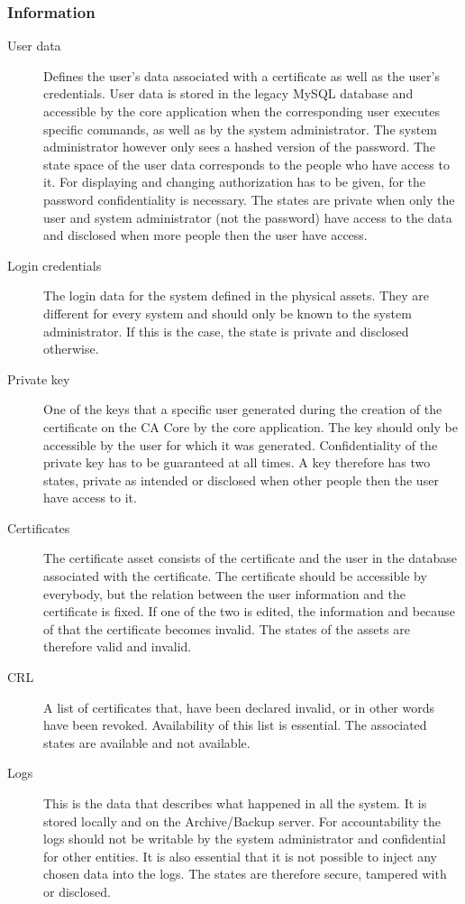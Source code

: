 \documentclass[a4paper, toc=index, 12pt, DIV14, twoside, BCOR2cm, headsepline, numbers=noenddot, bibliography=totoc]{scrbook}
\begin{document}
\subsubsection{Information}
\begin{description}
\item[User data ] Defines the user's data associated with a certificate as well as the user's credentials. User data is stored in the legacy MySQL database and accessible by the core application when the corresponding user executes specific commands, as well as by the system administrator. The system administrator however only sees a hashed version of the password. The state space of the user data corresponds to the people who have access to it. For displaying and changing authorization has to be given, for the password confidentiality is necessary. The states are private when only the user and system administrator (not the password) have access to the data and disclosed when more people then the user have access.
\item[Login credentials ] The login data for the system defined in the physical assets. They are different for every system and should only be known to the system administrator. If this is the case, the state is private and disclosed otherwise.
\item[Private key ] One of the keys that a specific user generated during the creation of the certificate on the CA Core by the core application. The key should only be accessible by the user for which it was generated. Confidentiality of the private key has to be guaranteed at all times. A key therefore has two states, private as intended or disclosed when other people then the user have access to it.
\item[Certificates ] The certificate asset consists of the certificate and the user in the database associated with the certificate. The certificate should be accessible by everybody, but the relation between the user information and the certificate is fixed. If one of the two is edited, the information and because of that the certificate becomes invalid. The states of the assets are therefore valid and invalid.
\item[CRL ] A list of certificates that, have been declared invalid, or in other words have been revoked. Availability of this list is essential. The associated states are available and not available.
\item[Logs ] This is the data that describes what happened in all the system. It is stored locally and on the Archive/Backup server. For accountability the logs should not be writable by the system administrator and confidential for other entities. It is also essential that it is not possible to inject any chosen data into the logs. The states are therefore secure, tampered with or disclosed.

\end{description}
\end{document}
